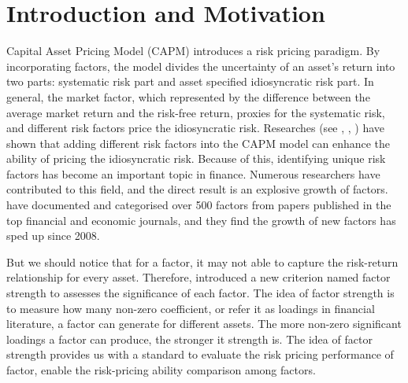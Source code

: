 \chapter{Introduction and Motivation}
Capital Asset Pricing Model (CAPM) \cite{Sharpe1964, Lintner1965, Black1972} introduces a risk pricing paradigm.
By incorporating factors, the model divides the uncertainty of an asset's return into two parts: systematic risk part and asset specified idiosyncratic risk part.
In general, the market factor, which represented by the difference between the average market return and the risk-free return, proxies for the systematic risk, and different risk factors price the idiosyncratic risk.
Researches (see , , ) have shown that adding different risk factors into the CAPM model can enhance the ability of pricing the idiosyncratic risk.
Because of this, identifying unique risk factors has become an important topic in finance.
Numerous researchers have contributed to this field, and the direct result is an explosive growth of factors.
  have documented and categorised over 500 factors from papers published in the top financial and economic journals, and they find the growth of new factors has sped up since 2008. 
 
But we should notice that for a factor, it may not able to capture the risk-return relationship for every asset.
Therefore,  introduced a new criterion named factor strength to assesses the significance of each factor.
The idea of factor strength is to measure how many non-zero coefficient, or refer it as loadings in financial literature, a factor can generate for different assets.
The more non-zero significant loadings a factor can produce, the stronger it strength is.
The idea of factor strength provides us with a standard to evaluate the risk pricing performance of factor, enable the risk-pricing ability comparison among factors.

